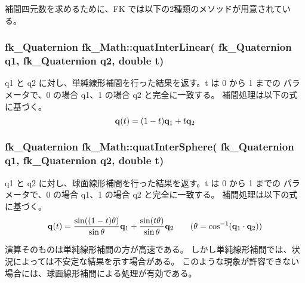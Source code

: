 補間四元数を求めるために、FK では以下の2種類のメソッドが用意されている。

\subsubsection*{fk\_Quaternion \quad fk\_Math::quatInterLinear(
fk\_Quaternion q1, fk\_Quaternion q2, double t)}
q1 と q2 に対し、単純線形補間を行った結果を返す。t は 0 から 1 までの
パラメータで、0 の場合 q1、1 の場合 q2 と完全に一致する。
補間処理は以下の式に基づく。
\[
	\mathbf{q}(t) = (1 - t)\mathbf{q}_1 + t\mathbf{q}_2
\]

\subsubsection*{fk\_Quaternion \quad fk\_Math::quatInterSphere(
fk\_Quaternion q1, fk\_Quaternion q2, double t)}
q1 と q2 に対し、球面線形補間を行った結果を返す。t は 0 から 1 までの
パラメータで、0 の場合 q1、1 の場合 q2 と完全に一致する。
補間処理は以下の式に基づく。
\[
	\mathbf{q}(t) = \frac{\sin((1-t)\theta)}{\sin\theta}\mathbf{q}_1 +
	       \frac{\sin(t\theta)}{\sin\theta}\mathbf{q}_2
	       \qquad (\theta = \cos^{-1}(\mathbf{q}_1\cdot\mathbf{q}_2))
\]

演算そのものは単純線形補間の方が高速である。
しかし単純線形補間では、状況によっては不安定な結果を示す場合がある。
このような現象が許容できない場合には、球面線形補間による処理が有効である。

